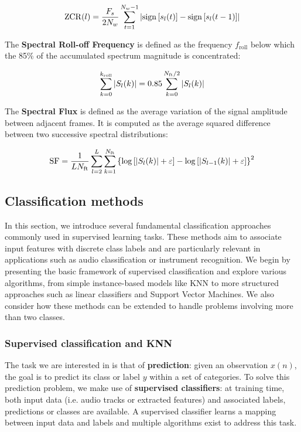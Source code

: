 \[
\mathrm{ZCR}(l) = \frac{F_s}{2N_w} \sum_{t=1}^{N_w-1} \abs{ \mathrm{sign}\left[s_l(t)\right] - \mathrm{sign}\left[s_l(t-1)\right] }
\]

The \textbf{Spectral Roll-off Frequency} is defined as the frequency $f_{\mathrm{roll}}$ below which the 85\% of the accumulated spectrum magnitude is concentrated:

\[
\sum_{k=0}^{k_{\mathrm{roll}}} \abs{ S_l(k) } = 0.85 \sum_{k=0}^{N_\text{ft}/2} \abs{ S_l(k) }
\]

The \textbf{Spectral Flux} is defined as the average variation of the signal amplitude between adjacent frames.
It is computed as the average squared difference between two successive spectral distributions:

\[
\mathrm{SF} = \frac{1}{L N_\text{ft}} \sum_{l=2}^{L} \sum_{k=1}^{N_\text{ft}} \left\{ \log\left[ \abs{ S_l(k) } + \varepsilon \right] - \log\left[ \abs{ S_{l-1}(k) } + \varepsilon \right] \right\}^2
\]

\subsection{Classification methods}
In this section, we introduce several fundamental classification approaches commonly used in supervised learning tasks.
These methods aim to associate input features with discrete class labels and are particularly relevant in applications such as audio classification or instrument recognition.
We begin by presenting the basic framework of supervised classification and explore various algorithms, from simple instance-based models like KNN to more structured approaches such as linear classifiers and Support Vector Machines.
We also consider how these methods can be extended to handle problems involving more than two classes.

\subsubsection{Supervised classification and KNN}
The task we are interested in is that of \textbf{prediction}: given an observation $x(n)$, the goal is to predict its class or label $y$ within a set of categories.
To solve this prediction problem, we make use of \textbf{supervised classifiers}: at training time, both input data (i.e. audio tracks or extracted features) and associated labels, predictions or classes are available.
A supervised classifier learns a mapping between input data and labels and multiple algorithms exist to address this task.

